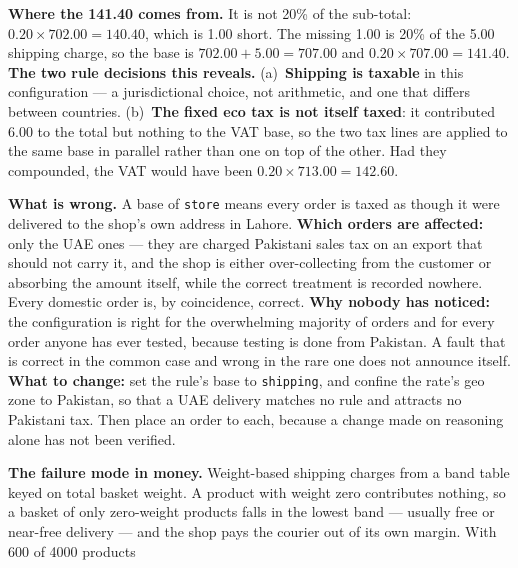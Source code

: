 \begin{ans}
  \item \textbf{Where the 141.40 comes from.} It is not 20\% of the
        sub-total: $0.20 \times 702.00 = 140.40$, which is 1.00 short. The
        missing 1.00 is 20\% of the 5.00 shipping charge, so the base is
        $702.00 + 5.00 = 707.00$ and $0.20 \times 707.00 = 141.40$.
        \textbf{The two rule decisions this reveals.} (a)~\textbf{Shipping is
        taxable} in this configuration --- a jurisdictional choice, not
        arithmetic, and one that differs between countries. (b)~\textbf{The
        fixed eco tax is not itself taxed}: it contributed 6.00 to the total
        but nothing to the VAT base, so the two tax lines are applied to the
        same base in parallel rather than one on top of the other. Had they
        compounded, the VAT would have been $0.20 \times 713.00 = 142.60$.
  \item \textbf{What is wrong.} A base of \texttt{store} means every order is
        taxed as though it were delivered to the shop's own address in Lahore.
        \textbf{Which orders are affected:} only the UAE ones --- they are
        charged Pakistani sales tax on an export that should not carry it, and
        the shop is either over-collecting from the customer or absorbing the
        amount itself, while the correct treatment is recorded nowhere. Every
        domestic order is, by coincidence, correct. \textbf{Why nobody has
        noticed:} the configuration is right for the overwhelming majority of
        orders and for every order anyone has ever tested, because testing is
        done from Pakistan. A fault that is correct in the common case and
        wrong in the rare one does not announce itself. \textbf{What to
        change:} set the rule's base to \texttt{shipping}, and confine the
        rate's geo zone to Pakistan, so that a UAE delivery matches no rule
        and attracts no Pakistani tax. Then place an order to each, because a
        change made on reasoning alone has not been verified.
  \item \textbf{The failure mode in money.} Weight-based shipping charges from
        a band table keyed on total basket weight. A product with weight zero
        contributes nothing, so a basket of only zero-weight products falls in
        the lowest band --- usually free or near-free delivery --- and the shop
        pays the courier out of its own margin. With 600 of 4000 products

\end{ans}
